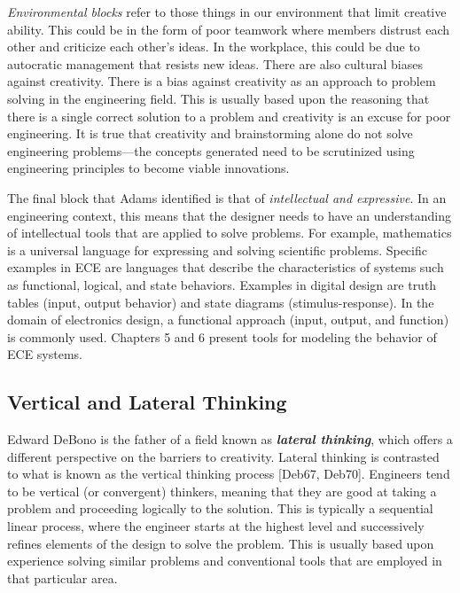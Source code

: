 \emph{Environmental blocks} refer to those things in our environment
that limit creative ability. This could be in the form of poor teamwork
where members distrust each other and criticize each other's ideas. In
the workplace, this could be due to autocratic management that resists
new ideas. There are also cultural biases against creativity. There is a
bias against creativity as an approach to problem solving in the
engineering field. This is usually based upon the reasoning that there
is a single correct solution to a problem and creativity is an excuse
for poor engineering. It is true that creativity and brainstorming alone
do not solve engineering problems---the concepts generated need to be
scrutinized using engineering principles to become viable innovations.

The final block that Adams identified is that of \emph{intellectual and
expressive}. In an engi­neering context, this means that the designer
needs to have an understanding of intellectual tools that are applied to
solve problems. For example, mathematics is a universal language for
expressing and solving scientific problems. Specific examples in ECE are
languages that de­scribe the characteristics of systems such as
functional, logical, and state behaviors. Examples in digital design are
truth tables (input, output behavior) and state diagrams
(stimulus-response). In the domain of electronics design, a functional
approach (input, output, and function) is commonly used. Chapters 5 and
6 present tools for modeling the behavior of ECE systems.

\subsection{Vertical and Lateral Thinking}
\label{subsection:vertical-and-lateral-thinking}

Edward DeBono is the father of a field known as \emph{\textbf{lateral
thinking}}, which offers a different per­spective on the barriers to
creativity. Lateral thinking is contrasted to what is known as the
vertical thinking process {[}Deb67, Deb70{]}. Engineers tend to be
vertical (or convergent) think­ers, meaning that they are good at taking
a problem and proceeding logically to the solution. This is typically a
sequential linear process, where the engineer starts at the highest
level and successively refines elements of the design to solve the
problem. This is usually based upon experience solving similar problems
and conventional tools that are employed in that par­ticular area.

